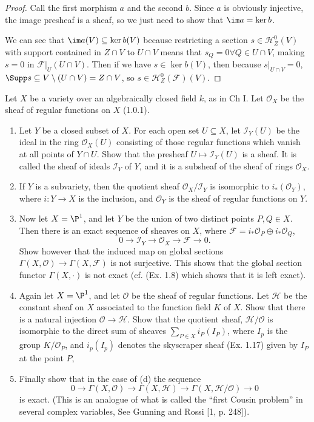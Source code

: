 \begin{proof}
	Call the first morphism $a $ and the second $b $.
	Since $a $ is obviously injective, the image presheaf is a sheaf, so we just need to show that $\im a = \ker b $.

	We can see that $\im a(V) \subseteq \ker b(V) $ because restricting a section $s \in \mathscr{H}_Z^0(V) $ with support contained in $Z\cap V $ to $U \cap V$ means that $s_Q = 0 \forall Q \in U\cap V $, making $s=0 $ in $\mathscr{F}|_U(U\cap V) $.
	Then if we have $s \in \ker b(V)$, then because $s|_{U\cap V}=0 $, $\Supp s \subseteq V \setminus (U\cap V) = Z\cap V$, so $s \in \mathscr{H}_Z^0(\mathscr{F})(V) $.
\end{proof}

\begin{exercise} %
	Let $X$ be a variety over an algebraically closed field $k$, as in Ch I. Let $\mathcal{O}_X $ be the sheaf of regular functions on $X$ (1.0.1). 
	\begin{enumerate}
		\item Let $Y$ be a closed subset of $X$. For each open set $U \subseteq X$, let $\mathscr{I}_Y(U)$ be the ideal in the ring $\mathcal{O}_X(U)$ consisting of those regular functions which vanish at all points of $Y \cap U$. Show that the presheaf $U \mapsto \mathscr{I}_Y(U)$ is a sheaf. It is called the sheaf of ideals $\mathscr{I}_Y$ of $Y$, and it is a subsheaf of the sheaf of rings $\mathcal{O}_X $.
		\item If $Y$ is a subvariety, then the quotient sheaf $\mathcal{O}_X/\mathscr{I}_Y$ is isomorphic to $i_\ast(\mathcal{O}_Y)$, where $i: Y \to X$ is the inclusion, and $\mathcal{O}_Y$ is the sheaf of regular functions on $Y$. 
		\item Now let $X = \P^1$, and let $Y$ be the union of two distinct points $P,Q \in X$. Then there is an exact sequence of sheaves on $X$, where $\mathscr{F} = i_\ast\mathcal{O}_P \oplus i_\ast\mathcal{O}_Q$, 
			\[
			0\to \mathscr{I}_Y \to \mathcal{O}_X \to \mathscr{F} \to 0. 
		\]
		Show however that the induced map on global sections $\Gamma(X,\mathcal{O}) \to \Gamma(X,\mathscr{F})$ is not surjective. This shows that the global section functor $\Gamma(X,\cdot)$ is not exact (cf. (Ex. 1.8) which shows that it is left exact). 
		\item Again let $X = \P^1$, and let $\mathcal{O}$ be the sheaf of regular functions. Let $\mathscr{H}$ be the constant sheaf on $X$ associated to the function field $K$ of $X$. Show that there is a natural injection $\mathcal{O} \to \mathscr{H}$. Show that the quotient sheaf, $\mathscr{H} / \mathcal{O}$ is isomorphic to the direct sum of sheaves $\sum_{P\in X} i_P(I_P) $, where $I_p$ is the group $K/\mathcal{O}_P$, and $i_p(I_p)$ denotes the skyscraper sheaf (Ex. 1.17) given by $I_P$ at the point $P$, 
		\item Finally show that in the case of (d) the sequence 
		\[
			0\to \Gamma(X,\mathcal{O}) \to \Gamma(X,\mathscr{H}) \to \Gamma(X,\mathscr{H}/\mathcal{O}) \to 0 
		\]
		is exact. (This is an analogue of what is called the ``first Cousin problem'' in several complex variables, See Gunning and Rossi [1, p. 248]).
	\end{enumerate}
\end{exercise}
